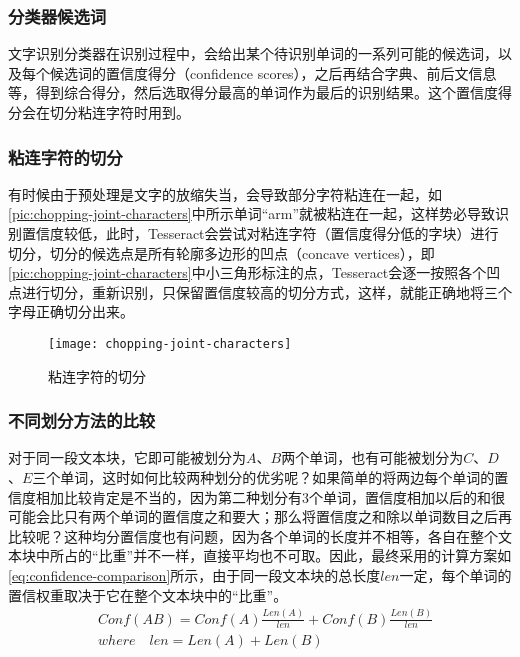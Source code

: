 \subsubsection*{分类器候选词}
文字识别分类器在识别过程中，会给出某个待识别单词的一系列可能的候选词，以及每个候选词的置信度得分（confidence scores），之后再结合字典、前后文信息等，得到综合得分，然后选取得分最高的单词作为最后的识别结果。这个置信度得分会在切分粘连字符时用到。

\subsubsection*{粘连字符的切分}
有时候由于预处理是文字的放缩失当，会导致部分字符粘连在一起，如\autoref{pic:chopping-joint-characters}中所示单词“arm”就被粘连在一起，这样势必导致识别置信度较低，此时，Tesseract会尝试对粘连字符（置信度得分低的字块）进行切分，切分的候选点是所有轮廓多边形的凹点（concave vertices），即\autoref{pic:chopping-joint-characters}中小三角形标注的点，Tesseract会逐一按照各个凹点进行切分，重新识别，只保留置信度较高的切分方式，这样，就能正确地将三个字母正确切分出来。
\begin{figure}
	\centering
	\texttt{[image: chopping-joint-characters]}
	\caption{粘连字符的切分}
	\label{pic:chopping-joint-characters}
\end{figure}

\subsubsection*{不同划分方法的比较}
对于同一段文本块，它即可能被划分为$A$、$B$两个单词，也有可能被划分为$C$、$D$、$E$三个单词，这时如何比较两种划分的优劣呢？如果简单的将两边每个单词的置信度相加比较肯定是不当的，因为第二种划分有3个单词，置信度相加以后的和很可能会比只有两个单词的置信度之和要大；那么将置信度之和除以单词数目之后再比较呢？这种均分置信度也有问题，因为各个单词的长度并不相等，各自在整个文本块中所占的“比重”并不一样，直接平均也不可取。因此，最终采用的计算方案如\autoref{eq:confidence-comparison}所示，由于同一段文本块的总长度$len$一定，每个单词的置信权重取决于它在整个文本块中的“比重”。
\begin{equation} \label{eq:confidence-comparison}
	\begin{split}
		&Conf(AB) = Conf(A)\frac{Len(A)}{len} + Conf(B)\frac{Len(B)}{len} \\
		&where \quad len=Len(A) + Len(B)
	\end{split}
\end{equation}

